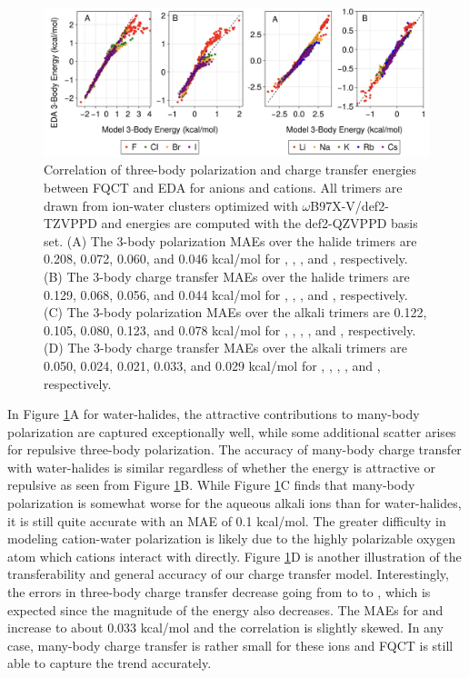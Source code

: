 \documentclass[journal=jctcce,manuscript=article]{achemso}
\begin{document}
\begin{figure}[h]
  \includegraphics*[width=\textwidth]{figures/three_body_pol_and_ct_ions.png}
  \caption{Correlation of three-body polarization and charge transfer energies between FQCT and EDA for anions and cations. All trimers are drawn from ion-water clusters optimized with $\omega$B97X-V/def2-TZVPPD and energies are computed with the def2-QZVPPD basis set. (A) The 3-body polarization MAEs over the halide trimers are 0.208, 0.072, 0.060, and 0.046 kcal/mol
  for , , , and , respectively. (B) The 3-body charge transfer MAEs over
  the halide trimers are 0.129, 0.068, 0.056, and 0.044 kcal/mol
  for , , , and , respectively. (C) The 3-body polarization MAEs over the alkali trimers are 0.122, 0.105, 0.080, 0.123, and 0.078 kcal/mol for , , , , and ,
  respectively. (D) The 3-body charge transfer MAEs over the alkali trimers are
  0.050, 0.024, 0.021, 0.033, and 0.029 kcal/mol for , , , , and ,
  respectively.
}
  \label{fig:Pol_CT_ions}
\end{figure}

In Figure \ref{fig:Pol_CT_ions}A for water-halides, the attractive contributions to many-body polarization are captured exceptionally well, while some additional scatter arises for repulsive three-body polarization. The accuracy of many-body charge transfer with water-halides is similar regardless of whether the energy is attractive or repulsive as seen from Figure \ref{fig:Pol_CT_ions}B. While Figure \ref{fig:Pol_CT_ions}C finds that many-body polarization is somewhat worse for the aqueous alkali ions than for water-halides, it is still quite accurate with an MAE of 0.1 kcal/mol. The greater difficulty in modeling cation-water polarization is likely due to the highly polarizable oxygen atom which cations interact with directly. Figure \ref{fig:Pol_CT_ions}D is another illustration of the transferability and general accuracy of our charge transfer model. Interestingly, the errors in three-body charge transfer decrease going from  to  to , which is expected since the magnitude of the energy also decreases. The MAEs for  and  increase to about 0.033 kcal/mol and the correlation is slightly skewed. In any case, many-body charge transfer is rather small for these ions and FQCT is still able to capture the trend accurately.
\end{document}
